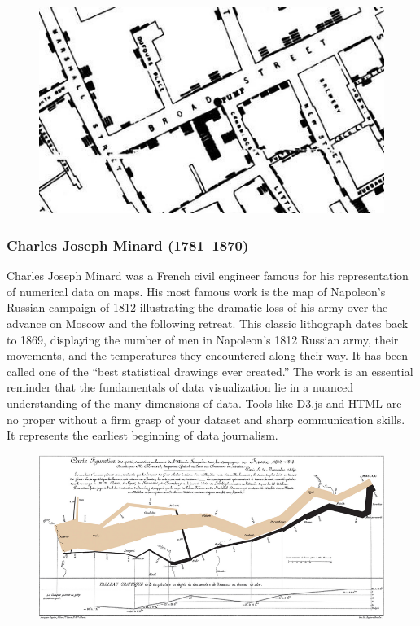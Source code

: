 \documentclass[]{book}
\theoremstyle{definition}
\theoremstyle{definition}
\theoremstyle{definition}
\theoremstyle{remark}
\begin{document}
\begin{figure}
\centering
\includegraphics{images/Snow.png}
\caption{}
\end{figure}

\subsubsection{Charles Joseph Minard
(1781--1870)}\label{charles-joseph-minard-17811870}

Charles Joseph Minard was a French civil engineer famous for his
representation of numerical data on maps. His most famous work is the
map of Napoleon's Russian campaign of 1812 illustrating the dramatic
loss of his army over the advance on Moscow and the following retreat.
This classic lithograph dates back to 1869, displaying the number of men
in Napoleon's 1812 Russian army, their movements, and the temperatures
they encountered along their way. It has been called one of the ``best
statistical drawings ever created.'' The work is an essential reminder
that the fundamentals of data visualization lie in a nuanced
understanding of the many dimensions of data. Tools like D3.js and HTML
are no proper without a firm grasp of your dataset and sharp
communication skills. It represents the earliest beginning of data
journalism.

\begin{figure}
\centering
\includegraphics{images/Minard.png}
\caption{}
\end{figure}
\end{document}
